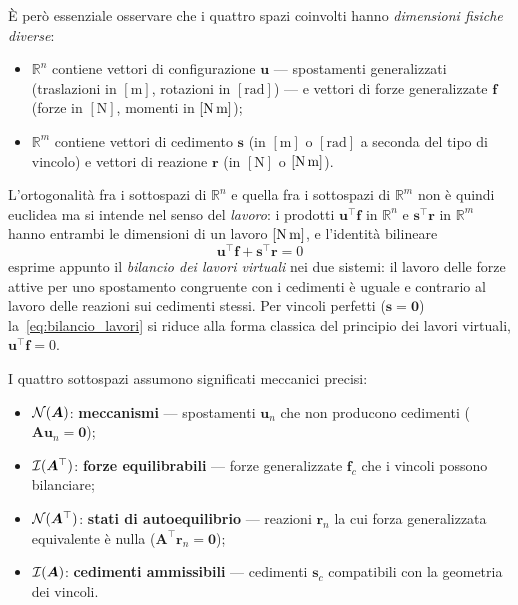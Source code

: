 È però essenziale osservare che i quattro spazi coinvolti hanno
\emph{dimensioni fisiche diverse}:
\begin{itemize}[nosep]
	\item $\mathbb{R}^n$ contiene vettori di configurazione $\bm{u}$ ---
	spostamenti generalizzati (traslazioni in $[\text{m}]$, rotazioni
	in $[\text{rad}]$) --- e vettori di forze generalizzate $\bm{f}$
	(forze in $[\text{N}]$, momenti in $[\text{N\,m}]$);
	\item $\mathbb{R}^m$ contiene vettori di cedimento $\bm{s}$
	(in $[\text{m}]$ o $[\text{rad}]$ a seconda del tipo di vincolo)
	e vettori di reazione $\bm{r}$ (in $[\text{N}]$ o $[\text{N\,m}]$).
\end{itemize}
L'ortogonalità fra i sottospazi di $\mathbb{R}^n$ e quella fra i
sottospazi di $\mathbb{R}^m$ non è quindi euclidea ma si intende
nel senso del \emph{lavoro}: i prodotti $\bm{u}^\top\bm{f}$ in
$\mathbb{R}^n$ e $\bm{s}^\top\bm{r}$ in $\mathbb{R}^m$ hanno
entrambi le dimensioni di un lavoro $[\text{N\,m}]$, e
l'identità bilineare
\begin{equation}\label{eq:bilancio_lavori}
	\bm{u}^\top\bm{f} + \bm{s}^\top\bm{r} = 0
\end{equation}
esprime appunto il \emph{bilancio dei lavori virtuali} nei due
sistemi: il lavoro delle forze attive per uno spostamento
congruente con i cedimenti è uguale e contrario al lavoro delle
reazioni sui cedimenti stessi. Per vincoli perfetti
($\bm{s} = \bm{0}$) la~\eqref{eq:bilancio_lavori} si riduce alla
forma classica del principio dei lavori virtuali,
$\bm{u}^\top\bm{f} = 0$.


I quattro sottospazi assumono significati meccanici precisi:
\begin{itemize}[nosep]
	\item $\mathcal{N}(\bm{A})$: \textbf{meccanismi} --- spostamenti $\bm{u}_n$ che
	non producono cedimenti ($\bm{A}\bm{u}_n = \bm{0}$);
	\item $\mathcal{I}(\bm{A}^\top)$: \textbf{forze equilibrabili} --- forze
	generalizzate $\bm{f}_c$ che i vincoli possono bilanciare;
	\item $\mathcal{N}(\bm{A}^\top)$: \textbf{stati di autoequilibrio} --- reazioni
	$\bm{r}_n$ la cui forza generalizzata equivalente è nulla
	($\bm{A}^\top\bm{r}_n = \bm{0}$);
	\item $\mathcal{I}(\bm{A})$: \textbf{cedimenti ammissibili} --- cedimenti $\bm{s}_c$
	compatibili con la geometria dei vincoli.
\end{itemize}

